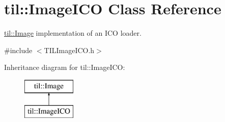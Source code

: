 \hypertarget{classtil_1_1_image_i_c_o}{
\section{til::ImageICO Class Reference}
\label{classtil_1_1_image_i_c_o}
}


\hyperlink{classtil_1_1_image}{til::Image} implementation of an ICO loader.  




{\ttfamily \#include $<$TILImageICO.h$>$}

Inheritance diagram for til::ImageICO:\begin{figure}[H]
\begin{center}
\leavevmode
\includegraphics[height=2.000000cm]{classtil_1_1_image_i_c_o}
\end{center}
\end{figure}
